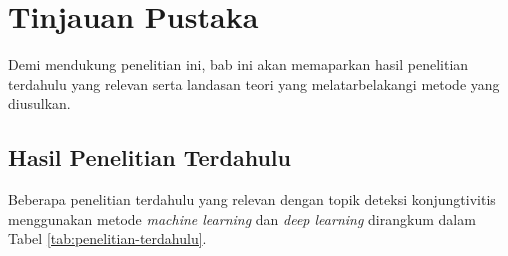 \chapter{Tinjauan Pustaka}
\label{chap:tinjauan-pustaka}


Demi mendukung penelitian ini, bab ini akan memaparkan hasil penelitian terdahulu yang relevan serta landasan teori yang melatarbelakangi metode yang diusulkan.

\section{Hasil Penelitian Terdahulu}
\label{sec:penelitian-terdahulu}

Beberapa penelitian terdahulu yang relevan dengan topik deteksi konjungtivitis menggunakan metode \textit{machine learning} dan \textit{deep learning} dirangkum dalam Tabel \ref{tab:penelitian-terdahulu}.

